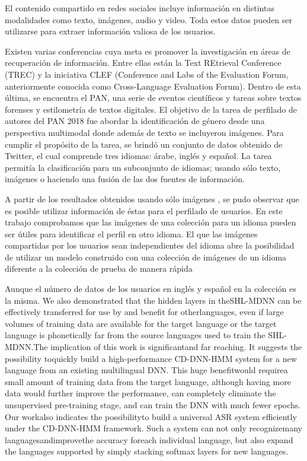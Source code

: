 \documentclass[runningheads]{llncs}
\begin{document}
El contenido compartido en redes sociales incluye información 
en distintas modalidades como texto, imágenes, audio y video.
Toda estos datos pueden ser utilizarse para extraer información
valiosa de los usuarios. 

Existen varias conferencias cuya meta 
es promover la investigación en áreas de recuperación
de información. Entre ellas están la Text REtrieval Conference (TREC) y la 
iniciativa CLEF (Conference and Labs of the Evaluation Forum, anteriormente 
conocida como Cross-Language Evaluation Forum). Dentro de esta última, se 
encuentra el PAN, una serie de eventos científicos y tareas sobre textos 
forenses y estilometría de textos digitales\cite{pan}. El objetivo de la tarea
de perfilado de autores del PAN 2018 fue abordar la identificación de género
desde una perspectiva multimodal donde además de texto se
incluyeron imágenes\cite{rangel_rosso_montes-y-gomez_potthast_stein}.
Para cumplir el propósito de la tarea, se brindó un conjunto de datos
obtenido de Twitter, el cual comprende tres idiomas: árabe, inglés y español.
La tarea permitía la clasificación para un subconjunto de idiomas; usando sólo texto, imágenes o haciendo una fusión de las dos fuentes de información.

A partir de los resultados obtenidos usando sólo imágenes 
\cite{rangel_rosso_montes-y-gomez_potthast_stein}, se pudo observar que es posible 
utilizar información de éstas para el perfilado de usuarios.
En este trabajo comprobamos que las imágenes de una colección para un
idioma  pueden ser útiles para identificar el perfil en otro idioma. 
El que las imágenes compartidas por los usuarios sean
independientes del idioma abre la posibilidad de utilizar
un modelo construido con una colección de imágenes de un 
idioma diferente a la colección de prueba de manera rápida


Aunque el número de datos de los usuarios en inglés y español en la colección es la misma.
We also demonstrated that the hidden layers in theSHL-MDNN can be effectively transferred  for  use  by  and  benefit  for  otherlanguages, even  if  large volumes of  training  data  are  available  for  the  target language or the target language is phonetically far from the source languages used to train the SHL-MDNN.The  implication  of  this  work  is  significantand  far  reaching. It suggests  the  possibility  toquickly  build  a  high-performance  CD-DNN-HMM   system for   a   new   language from   an   existing multilingual DNN. This huge benefitwould requirea small amount of training  data  from  the  target  language,  although  having  more data   would   further   improve   the   performance,   can   completely eliminate  the  unsupervised  pre-training  stage,  and  can  train  the DNN  with   much fewer epochs. Our   workalso   indicates the possibilityto  build  a  universal  ASR  system  efficiently  under  the CD-DNN-HMM framework. Such a system can not only recognizemany  languagesandimprovethe  accuracy foreach  individual language,  but  also  expand  the  languages  supported  by  simply stacking softmax layers for new languages. 
\end{document}
